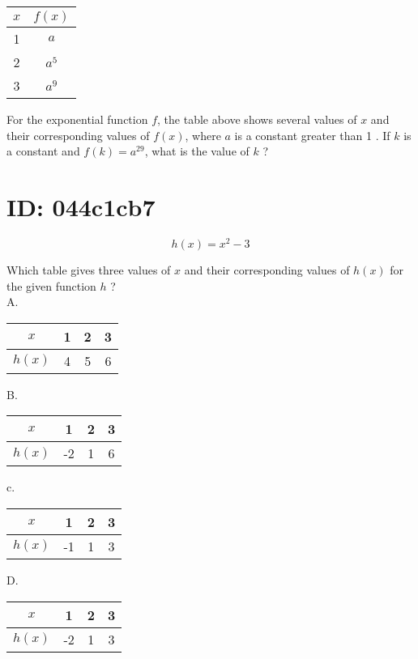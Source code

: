\begin{center}
\begin{tabular}{|c|c|}
\hline
$x$ & $f(x)$ \\
\hline
1 & $a$ \\
\hline
2 & $a^{5}$ \\
\hline
3 & $a^{9}$ \\
\hline
\end{tabular}
\end{center}

For the exponential function $f$, the table above shows several values of $x$ and their corresponding values of $f(x)$, where $a$ is a constant greater than 1 . If $k$ is a constant and $f(k)=a^{29}$, what is the value of $k$ ?

\section*{ID: 044c1cb7}
$$
h(x)=x^{2}-3
$$

Which table gives three values of $x$ and their corresponding values of $h(x)$ for the given function $h$ ?\\
A.

\begin{center}
\begin{tabular}{|c|c|c|c|}
\hline
$x$ & 1 & 2 & 3 \\
\hline
$h(x)$ & 4 & 5 & 6 \\
\hline
\end{tabular}
\end{center}

B.

\begin{center}
\begin{tabular}{|c|c|c|c|}
\hline
$x$ & 1 & 2 & 3 \\
\hline
$h(x)$ & -2 & 1 & 6 \\
\hline
\end{tabular}
\end{center}

c.

\begin{center}
\begin{tabular}{|c|c|c|c|}
\hline
$x$ & 1 & 2 & 3 \\
\hline
$h(x)$ & -1 & 1 & 3 \\
\hline
\end{tabular}
\end{center}

D.

\begin{center}
\begin{tabular}{|c|c|c|c|}
\hline
$x$ & 1 & 2 & 3 \\
\hline
$h(x)$ & -2 & 1 & 3 \\
\hline
\end{tabular}
\end{center}

